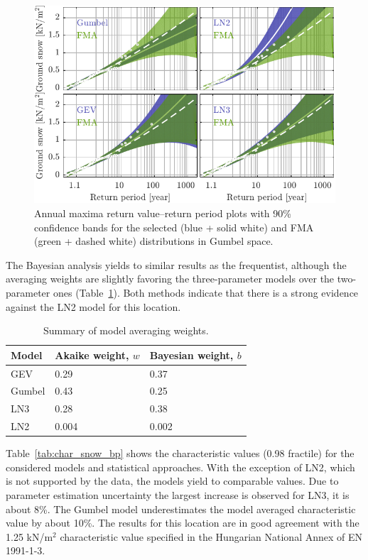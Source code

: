 \begin{figure}[htbp!]
	\centering    
	\includegraphics[]{filled_RP_RV_2x2_FMA_ID2546_CI09.pdf}
	\caption{Annual maxima return value--return period plots with 90\% confidence bands for the selected (blue + solid white) and FMA (green + dashed white) distributions in Gumbel space.}
	\label{fig:2546_rp_rv_2x2}
\end{figure}

The Bayesian analysis yields to similar results as the frequentist, although the averaging weights are slightly favoring the three-parameter models over the two-parameter ones (Table~\ref{tab:ma_weights}). Both methods indicate that there is a strong evidence against the LN2 model for this location.

\begin{table}[htbp!]
\caption{Summary of model averaging weights.}
\centering
\label{tab:ma_weights}
\small
    \begin{tabular}{lll}
    \toprule
    Model  & Akaike weight, $w$ & Bayesian weight, $b$ \\
    \midrule
    \rowcolor{lightgrey} GEV  & 0.29 & 0.37 \\
    Gumbel  & 0.43 & 0.25 \\
    \rowcolor{lightgrey} LN3  & 0.28 & 0.38 \\
    LN2  & 0.004 & 0.002 \\
    \bottomrule
    \end{tabular}
\end{table}

Table~\ref{tab:char_snow_bp} shows the characteristic values (0.98 fractile) for the considered models and statistical approaches. With the exception of LN2, which is not supported by the data, the models yield to comparable values. Due to parameter estimation uncertainty the largest increase is observed for LN3, it is about 8\%. The Gumbel model underestimates the model averaged characteristic value by about 10\%. The results for this location are in good agreement with the 1.25 kN/m$^2$ characteristic value specified in the Hungarian National Annex of EN 1991-1-3.

